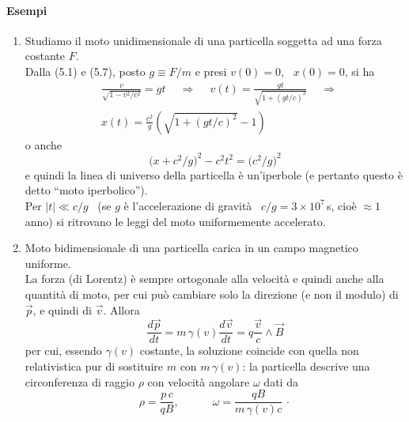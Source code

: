 \paragraph{Esempi}
\begin{enumerate}
  \item Studiamo il moto unidimensionale di una particella soggetta ad una forza
    costante $F$.\\
    Dalla (5.1) e (5.7), posto $g\equiv F/m$ e presi $v(0)=0$, \ $x(0)=0$, si ha
    \begin{equation}
      \begin{aligned}
        &\frac{v}{\sqrt{1-v^2/c^2}}=gt\quad\ \Rightarrow
        \quad\ v(t)=\frac{gt}{\sqrt{1+(gt/c)^2}}\quad\ \Rightarrow\\
        &x(t)=\frac{c^2}{g}\left(\sqrt{1+(gt/c)^2}-1\right)
      \end{aligned}
      \tag{5.8}
    \end{equation}
    o anche
    \begin{equation}
      \big(x+c^2/g\big)^2-c^2t^2=\big(c^2/g\big)^2
      \tag{5.9}
    \end{equation}
    e quindi la linea di universo della particella \`e un'iperbole (e pertanto
    questo \`e detto ``moto iperbolico'').\\
    Per $|t|\ll c/g$ \ (se $g$ \`e l'accelerazione di gravit\`a
    \ $c/g=3\times10^7$\,s, cio\`e $\approx1$\,anno) si ritrovano le leggi del
    moto uniformemente accelerato.
  \item Moto bidimensionale di una particella carica in un campo magnetico
    uniforme.\\
    La forza (di Lorentz) \`e sempre ortogonale alla velocit\`a e quindi anche
    alla quantit\`a di moto, per cui pu\`o cambiare solo la direzione (e non il
    modulo) di $\vec p$, e quindi di $\vec v$. Allora
    \begin{equation}
      \frac{d\vec p}{dt}=m\,\gamma(v)\frac{d\vec v}{dt}
      =q\frac{\vec v}{c}\wedge\vec B
      \tag{5.10}
    \end{equation}
    per cui, essendo $\gamma(v)$ costante, la soluzione coincide con quella non
    relativistica pur di sostituire $m$ con $m\,\gamma(v)$: la particella
    descrive una circonferenza di raggio $\rho$ con velocit\`a angolare $\omega$
    dati da
    \begin{equation}
      \rho=\frac{p\,c}{qB},\qquad\quad\omega=\frac{qB}{m\,\gamma(v)c}\,\cdot
      \tag{5.11}
    \end{equation}
\end{enumerate}

